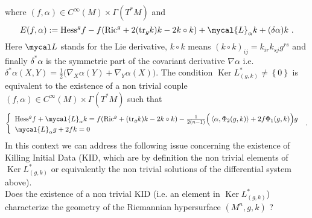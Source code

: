 \documentclass[a4paper,11pt,leqno]{amsart}
\numberwithin{equation}{section}
\theoremstyle{main}
\begin{document}
where $(f,\alpha)\in C^{\infty}(M) \times \Gamma(T^*M)$ and
$$ E(f,\alpha):= {\operatorname{Hess}}^g f -f({\operatorname{Ric}}^g +2 ({ {\rm tr}}_g k)k -2k\circ k) + \mycal{L}_\alpha k + (\delta \alpha)k \ . $$
Here $\mycal L$ stands for the Lie derivative, $k\circ k$ means $(k\circ k)_{ij}= k_{ir}k_{sj}g^{rs}$ and finally $\delta^{*}\alpha$ is the symmetric part of the covariant derivative $\nabla\alpha$ i.e. $\delta^{*}\alpha(X,Y)=\frac{1}{2}\big(\nabla_X \alpha(Y)+ \nabla_Y \alpha(X)\big)$. 
The condition ${\operatorname{Ker}} L^*_{(g,k)}\neq\left\{0\right\}$ is equivalent to the existence of a non trivial couple ${(f,\alpha)\in  C^{\infty}(M) \times \Gamma(T^*M)} $ such that
$$\left\{
\begin{array}{l}
	{\operatorname{Hess}}^g f + \mycal{L}_\alpha k = f({\operatorname{Ric}}^g + ({ {\rm tr}}_g k)k -2k\circ k) - \frac{1}{2(n-1)}\Big(  \left\langle \alpha, \Phi_2 (g,k)\right\rangle + 2f\Phi_1 (g,k)  \Big)g \\
	\mycal{L}_\alpha g + 2fk = 0
\end{array}\right. \ .$$
In this context we can address the following issue concerning the existence of Killing Initial Data (KID, which are by definition \cite{M} the non trivial elements of ${\operatorname{Ker}} L^*_{(g,k)}$ or equivalently the non trivial solutions of the differential system above).\\

{} Does the existence of a non trivial KID (i.e. an element in ${\operatorname{Ker}} L^*_{(g,k)}$) characterize the geometry of the Riemannian hypersurface $(M^n,g,k)$ ?\\
\end{document}
